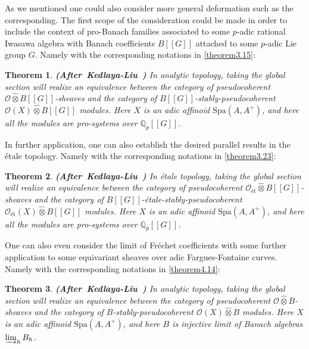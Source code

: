 \documentclass[12pt]{amsart}
\newtheorem{theorem}{Theorem}[section]
\theoremstyle{definition}
\numberwithin{equation}{section}
\begin{document}
\indent As we mentioned one could also consider more general deformation such as the corresponding. The first scope of the consideration could be made in order to include the context of pro-Banach families associated to some $p$-adic rational Iwasawa algebra with Banach coefficients $B[[G]]$ attached to some $p$-adic Lie group $G$. Namely with the corresponding notations in \cref{theorem3.15}:


\begin{theorem}\mbox{\bf{(After Kedlaya-Liu \cite[Theorem 2.5.5]{KL2})}} In analytic topology, taking the global section will realize an equivalence between the category of pseudocoherent $\mathcal{O}\widehat{\otimes} B[[G]]$-sheaves and the category of $B[[G]]$-stably-pseudocoherent $\mathcal{O}(X)\widehat{\otimes}B[[G]]$ modules. Here $X$ is an adic affinoid $\mathrm{Spa}(A,A^+)$, and here all the modules are pro-systems over $\mathbb{Q}_p[[G]]$. 
	
\end{theorem}

\indent In further application, one can also establish the desired parallel results in the \'etale topology. Namely with the corresponding notations in \cref{theorem3.23}:


\begin{theorem}\mbox{\bf{(After Kedlaya-Liu \cite[Theorem 2.5.14]{KL2})}} In \'etale topology, taking the global section will realize an equivalence between the category of pseudocoherent $\mathcal{O}_\text{\'et}\widehat{\otimes} B[[G]]$-sheaves and the category of $B[[G]]$-\'etale-stably-pseudocoherent $\mathcal{O}_\text{\'et}(X)\widehat{\otimes}B[[G]]$ modules. Here $X$ is an adic affinoid $\mathrm{Spa}(A,A^+)$, and here all the modules are pro-systems over $\mathbb{Q}_p[[G]]$.	
\end{theorem}



\indent One can also even consider the limit of Fr\'echet coefficients with some further application to some equivariant sheaves over adic Fargues-Fontaine curves. Namely with the corresponding notations in \cref{theorem4.14}:


\begin{theorem}\mbox{\bf{(After Kedlaya-Liu \cite[Theorem 2.5.5]{KL2})}} In analytic topology, taking the global section will realize an equivalence between the category of pseudocoherent $\mathcal{O}\widehat{\otimes} B$-sheaves and the category of $B$-stably-pseudocoherent $\mathcal{O}(X)\widehat{\otimes}B$ modules. Here $X$ is an adic affinoid $\mathrm{Spa}(A,A^+)$, and here $B$ is injective limit of Banach algebras $\varinjlim_h B_h$. 
	
\end{theorem}
\end{document}

